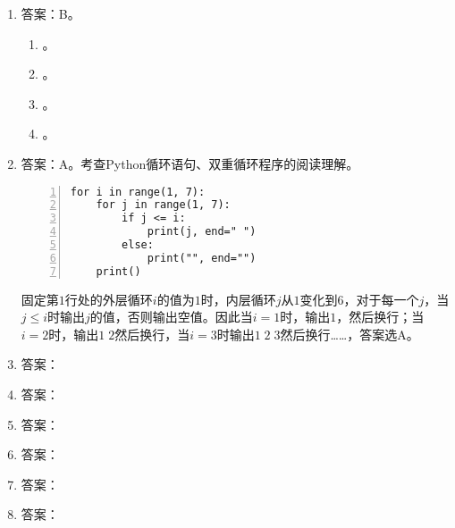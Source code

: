 \begin{enumerate}
\item 答案：B。
	\begin{enumerate}[label=\Alph*.]
	\item 。
	\item 。
	\item 。
	\item 。
	\end{enumerate}


\item 答案：A。考查Python循环语句、双重循环程序的阅读理解。
\begin{paracol}{2}
\begin{lstlisting}[numbers=left]
for i in range(1, 7):
    for j in range(1, 7):
        if j <= i:
            print(j, end=" ")
        else:
            print("", end="")
    print()
\end{lstlisting}
\switchcolumn
固定第$1$行处的外层循环$i$的值为$1$时，内层循环$j$从$1$变化到$6$，对于每一个$j$，当$j \le i$时输出$j$的值，否则输出空值。因此当$i=1$时，输出$1$，然后换行；当$i=2$时，输出$1 \; 2$然后换行，当$i=3$时输出$1 \; 2 \; 3$然后换行……，答案选A。
\end{paracol}

\item 答案：

\item 答案：

\item 答案：

\item 答案：

\item 答案：

\item 答案：


\end{enumerate}
